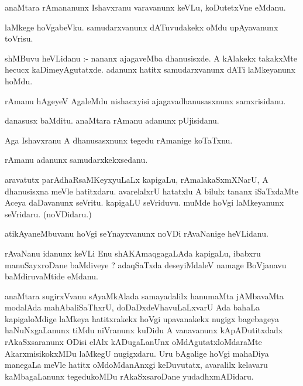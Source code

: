\documentclass{article}
\begin{document}
\begin{mn}
anaMtara  rAmananunx  Ishavxranu  varavanunx  keVLu,  koDutetxVne  eMdanu.
\end{mn}

\begin{mn}
laMkege  hoVgabeVku.  samudarxvanunx  dATuvudakekx  oMdu  upAyavanunx  toVrisu.
\end{mn}

\begin{mn}
shMBuvu  heVLidanu :- nananx  ajagaveMba  dhanusisxde.  A  kAlakekx  takakxMte  hecucx kaDimeyAgutatxde.  adanunx  hatitx  
samudarxvanunx  dATi  laMkeyanunx  hoMdu.
\end{mn}

\begin{mn}
rAmanu  hAgeyeV  AgaleMdu  nishacxyisi  ajagavadhanusasxnunx  samxrisidanu.
\end{mn}

\begin{mn}
danasusx  baMditu.  anaMtara  rAmanu  adanunx  pUjisidanu.  
\end{mn}

\begin{mn}
Aga  Ishavxranu  A  dhanusasxnunx  tegedu  rAmanige  koTaTxnu.
\end{mn}

\begin{mn}
rAmanu  adanunx  samudarxkekxsedanu.
\end{mn}

\begin{mn}
aravatutx  parAdhaRsaMKeyxyuLaLx  kapigaLu,  rAmalakaSxmXNarU,  A  dhanusisxna  meVle  hatitxdaru.  avarelalxrU  hatatxlu  A  
bilulx  tananx  iSaTxdaMte  Aceya  daDavanunx  seVritu.  kapigaLU  seVriduvu.  muMde  hoVgi  laMkeyanunx  seVridaru.  (noVDidaru.) 
\end{mn}

\begin{mn}
atikAyaneMbuvanu  hoVgi  seYnayxvanunx  noVDi  rAvaNanige  heVLidanu.
\end{mn}

\begin{mn}
rAvaNanu  idanunx  keVLi  Enu  shAKAmaqgagaLAda  kapigaLu,  ibabxru  manuSayxroDane  baMdiveye ?  adaqSaTxda  deseyiMdaleV  
namage  BoVjanavu  baMdiruvaMtide  eMdanu.
\end{mn}

\begin{mn}
anaMtara  sugirxVvanu  sAyaMkAlada  samayadalilx  hanumaMta  jAMbavaMta  modalAda  mahAbaliSaThxrU,  doDaDxdeVhavuLaLxvarU  
Ada  bahaLa  kapigaloMdige  laMkeya  hatitxrakekx  hoVgi  upavanakekx  nugigx  bagebageya  haNuNxgaLanunx  tiMdu  niVranunx  
kuDidu  A  vanavanunx  kApADutitxdadx  rAkaSxsaranunx  ODisi  elAlx  kADugaLanUnx  oMdAgutatxloMdaraMte  AkarxmisikokxMDu  
laMkegU  nugigxdaru.  Uru  bAgalige  hoVgi  mahaDiya  manegaLa  meVle  hatitx  oMdoMdanAnxgi  keDuvutatx,  avaralilx  kelavaru  
kaMbagaLanunx  tegedukoMDu  rAkaSxsaroDane  yudadhxmADidaru.
\end{mn}
\end{document}
